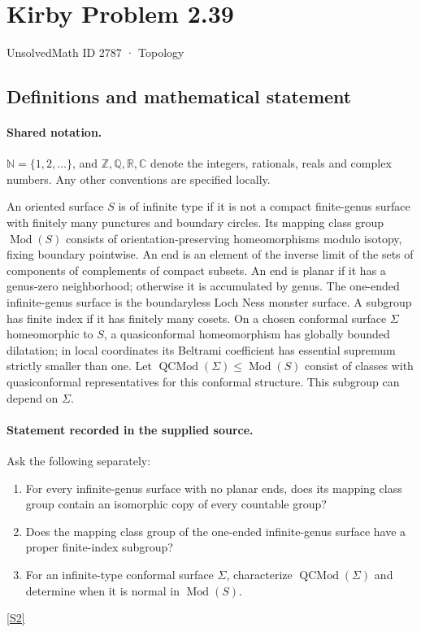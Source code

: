 \documentclass[11pt]{article}
\newcommand{\sref}[2]{\hyperlink{source:#1:#2}{[S#2]}}
\begin{document}
\setcounter{section}{2786}
\section{Kirby Problem 2.39}\label{2787}
{\small\sffamily UnsolvedMath ID 2787 · Topology}
\subsection{Definitions and mathematical statement}

\paragraph{Shared notation.}$\mathbb N=\{1,2,\ldots\}$, and $\mathbb Z,\mathbb Q,\mathbb R,\mathbb C$ denote the integers, rationals, reals and complex numbers. Any other conventions are specified locally.


An oriented surface $S$ is of infinite type if it is not a compact finite-genus surface with finitely many punctures and boundary circles. Its mapping class group $\operatorname{Mod}(S)$ consists of orientation-preserving homeomorphisms modulo isotopy, fixing boundary pointwise. An end is an element of the inverse limit of the sets of components of complements of compact subsets. An end is planar if it has a genus-zero neighborhood; otherwise it is accumulated by genus. The one-ended infinite-genus surface is the boundaryless Loch Ness monster surface. A subgroup has finite index if it has finitely many cosets. On a chosen conformal surface $\Sigma$ homeomorphic to $S$, a quasiconformal homeomorphism has globally bounded dilatation; in local coordinates its Beltrami coefficient has essential supremum strictly smaller than one. Let $\operatorname{QCMod}(\Sigma)\le\operatorname{Mod}(S)$ consist of classes with quasiconformal representatives for this conformal structure. This subgroup can depend on $\Sigma$.
\paragraph{Statement recorded in the supplied source.}
Ask the following separately:
\begin{enumerate}
\item For every infinite-genus surface with no planar ends, does its mapping class group contain an isomorphic copy of every countable group?
\item Does the mapping class group of the one-ended infinite-genus surface have a proper finite-index subgroup?
\item For an infinite-type conformal surface $\Sigma$, characterize $\operatorname{QCMod}(\Sigma)$ and determine when it is normal in $\operatorname{Mod}(S)$.
\end{enumerate} \sref{2787}{2}
\end{document}

